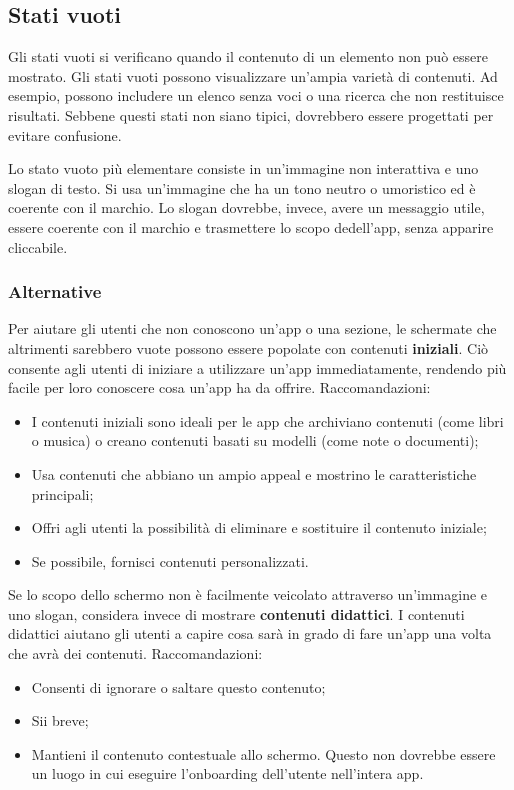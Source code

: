 \documentclass[12pt, a4paper]{report}
\begin{document}
	\subsection{Stati vuoti}
	Gli stati vuoti si verificano quando il contenuto di un elemento non può essere mostrato. Gli stati vuoti possono visualizzare un'ampia varietà di contenuti. Ad esempio, possono includere un elenco senza voci o una ricerca che non restituisce risultati. Sebbene questi stati non siano tipici, dovrebbero essere progettati per evitare confusione.

	Lo stato vuoto più elementare consiste in un'immagine non interattiva e uno slogan di testo. Si usa un'immagine che ha un tono neutro o umoristico ed è coerente con il marchio. Lo slogan dovrebbe, invece, avere un messaggio utile, essere coerente con il  marchio e trasmettere lo scopo dedell’app, senza apparire cliccabile.

	\subsubsection{Alternative}
	Per aiutare gli utenti che non conoscono un'app o una sezione, le schermate che altrimenti sarebbero vuote possono essere popolate con contenuti \textbf{iniziali}. Ciò consente agli utenti di iniziare a utilizzare un'app immediatamente, rendendo più facile per loro conoscere cosa un'app ha da offrire. Raccomandazioni:
	\begin{itemize}
		\item I contenuti iniziali sono ideali per le app che archiviano contenuti (come libri o musica) o creano contenuti basati su modelli (come note o documenti);
		\item Usa contenuti che abbiano un ampio appeal e mostrino le caratteristiche principali;
		\item Offri agli utenti la possibilità di eliminare e sostituire il contenuto iniziale;
		\item Se possibile, fornisci contenuti personalizzati.
	\end{itemize}
	Se lo scopo dello schermo non è facilmente veicolato attraverso un'immagine e uno slogan, considera invece di mostrare \textbf{contenuti didattici}. I contenuti didattici aiutano gli utenti a capire cosa sarà in grado di fare un'app una volta che avrà dei contenuti. Raccomandazioni:
	\begin{itemize}
		\item Consenti di ignorare o saltare questo contenuto;
		\item Sii breve;
		\item Mantieni il contenuto contestuale allo schermo. Questo non dovrebbe essere un luogo in cui eseguire l'onboarding dell'utente nell'intera app.
	\end{itemize}
\end{document}
